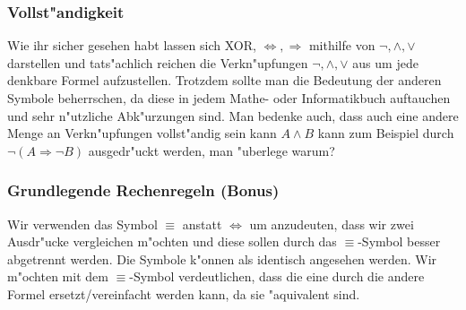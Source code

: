 \subsubsection{Vollst"andigkeit}
Wie ihr sicher gesehen habt lassen sich XOR, $\iff, \Rightarrow$ mithilfe von $\neg, \land, \lor$ darstellen und tats"achlich reichen die Verkn"upfungen $\neg, \land, \lor$ aus um jede denkbare Formel aufzustellen. Trotzdem sollte man die Bedeutung der anderen Symbole beherrschen, da diese in jedem Mathe- oder Informatikbuch auftauchen und sehr n"utzliche Abk"urzungen sind. Man bedenke auch, dass auch eine andere Menge an Verkn"upfungen vollst"andig sein kann $A \land B$ kann zum Beispiel durch $\neg (A \Rightarrow \neg B)$ ausgedr"uckt werden, man "uberlege warum?

\subsubsection{Grundlegende Rechenregeln (Bonus)}
Wir verwenden das Symbol $\equiv$ anstatt $\iff$ um anzudeuten, dass wir zwei Ausdr"ucke vergleichen m"ochten und diese sollen durch das $\equiv$-Symbol besser abgetrennt werden. Die Symbole k"onnen als identisch angesehen werden. Wir m"ochten mit dem $\equiv$-Symbol verdeutlichen, dass die eine durch die andere Formel ersetzt/vereinfacht werden kann, da sie "aquivalent sind.

